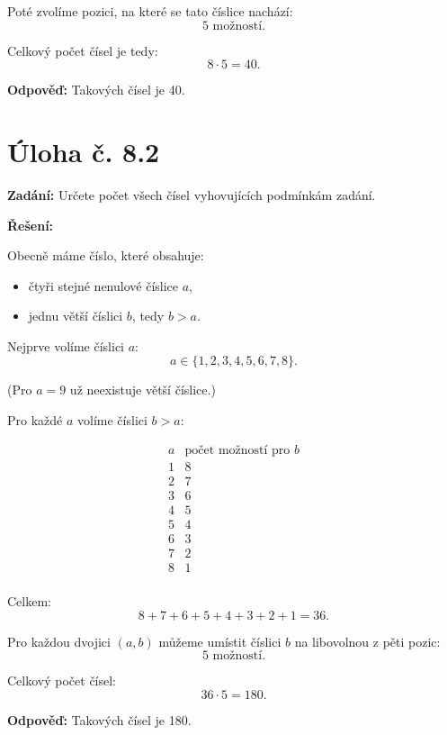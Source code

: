 \documentclass[12pt,a4paper]{article}
\begin{document}
Poté zvolíme pozici, na které se tato číslice nachází:
\[
5 \text{ možností}.
\]

Celkový počet čísel je tedy:
\[
8 \cdot 5 = 40.
\]

\bigskip

\textbf{Odpověď:}  
Takových čísel je 40.

\section*{Úloha č. 8.2}

\textbf{Zadání:}  
Určete počet všech čísel vyhovujících podmínkám zadání.

\bigskip

\textbf{Řešení:}

Obecně máme číslo, které obsahuje:
\begin{itemize}
    \item čtyři stejné nenulové číslice \(a\),
    \item jednu větší číslici \(b\), tedy \(b>a\).
\end{itemize}

\medskip

Nejprve volíme číslici \(a\):
\[
a \in \{1,2,3,4,5,6,7,8\}.
\]

(Pro \(a=9\) už neexistuje větší číslice.)

\medskip

Pro každé \(a\) volíme číslici \(b>a\):

\[
\begin{array}{c|c}
a & \text{počet možností pro } b \\
\hline
1 & 8 \\
2 & 7 \\
3 & 6 \\
4 & 5 \\
5 & 4 \\
6 & 3 \\
7 & 2 \\
8 & 1 \\
\end{array}
\]

Celkem:
\[
8+7+6+5+4+3+2+1=36.
\]

Pro každou dvojici \((a,b)\) můžeme umístit číslici \(b\) na libovolnou z pěti pozic:
\[
5 \text{ možností}.
\]

Celkový počet čísel:
\[
36 \cdot 5 = 180.
\]

\bigskip

\textbf{Odpověď:}  
Takových čísel je 180.
\end{document}
